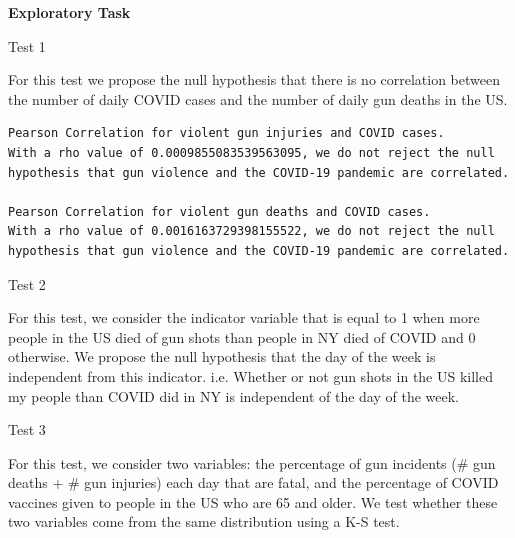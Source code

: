 \documentclass[12pt]{article}
\def\pp{\par\noindent}
\newcommand{\problem}[1]{\bigskip\pp\textbf{Part #1}\smallskip}
\renewcommand{\part}[1]{\smallskip\pp\textbf{#1)}\indent}
\begin{document}
\bigskip\pp\textbf{Exploratory Task}\smallskip
\pp Test 1
\par For this test we propose the null hypothesis that there is no
correlation between the number of daily COVID cases and the number of
daily gun deaths in the US.
\begin{verbatim}
Pearson Correlation for violent gun injuries and COVID cases.
With a rho value of 0.0009855083539563095, we do not reject the null
hypothesis that gun violence and the COVID-19 pandemic are correlated.

Pearson Correlation for violent gun deaths and COVID cases.
With a rho value of 0.0016163729398155522, we do not reject the null
hypothesis that gun violence and the COVID-19 pandemic are correlated.
\end{verbatim}

\pp Test 2
\par For this test, we consider the indicator variable that is equal
to 1 when more people in the US died of gun shots than people in NY
died of COVID and 0 otherwise. We propose the null hypothesis that the day of the
week is independent from this indicator. i.e. Whether or not gun shots in
the US killed my people than COVID did in NY is independent of the day
of the week.

\pp Test 3
\par For this test, we consider two variables: the percentage of gun
incidents (\# gun deaths + \# gun injuries) each day that are fatal, and
the percentage of COVID vaccines given to people in the US who are 65
and older. We test whether these two variables come from the same
distribution using a K-S test.

\end{document}
